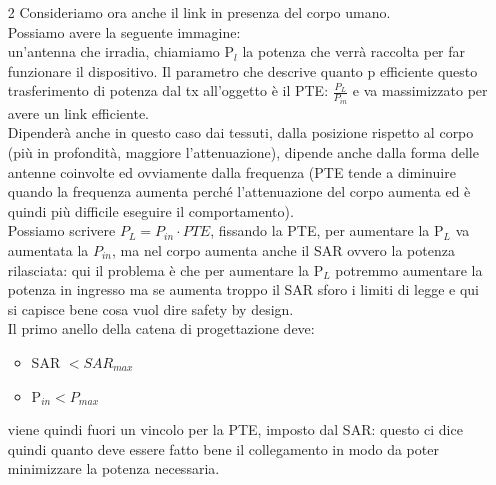 \documentclass[oneside, 12pt]{extbook}
\begin{document}
\begin{itemize}
	\item[2] Consideriamo ora anche il link in presenza del corpo umano.\\Possiamo avere la seguente immagine:\\un'antenna che irradia, chiamiamo P$_l$ la potenza che verrà raccolta per far funzionare il dispositivo. Il parametro che descrive quanto p efficiente questo trasferimento di potenza dal tx all'oggetto è il PTE: $\frac{P_L}{P_{in}}$ e va massimizzato per avere un link efficiente.\\Dipenderà anche in questo caso dai tessuti, dalla posizione rispetto al corpo (più in profondità, maggiore l'attenuazione), dipende anche dalla forma delle antenne coinvolte ed ovviamente dalla frequenza (PTE tende a diminuire quando la frequenza aumenta perché l'attenuazione del corpo aumenta ed è quindi più difficile eseguire il comportamento).\\Possiamo scrivere $P_L = P_{in} \cdot PTE$, fissando la PTE, per aumentare la P$_L$ va aumentata la $P_{in}$, ma nel corpo aumenta anche il SAR ovvero la potenza rilasciata: qui il problema è che per aumentare la P$_L$ potremmo aumentare la potenza in ingresso ma se aumenta troppo il SAR sforo i limiti di legge e qui si capisce bene cosa vuol dire safety by design.\\Il primo anello della catena di progettazione deve:
	\begin{itemize}
		\item SAR $< SAR_{max}$
		\item P$_{in} < P_{max}$
	\end{itemize} 
	viene quindi fuori un vincolo per la PTE, imposto dal SAR: questo ci dice quindi quanto deve essere fatto bene il collegamento in modo da poter minimizzare la potenza necessaria.
\end{itemize}
\end{document}
